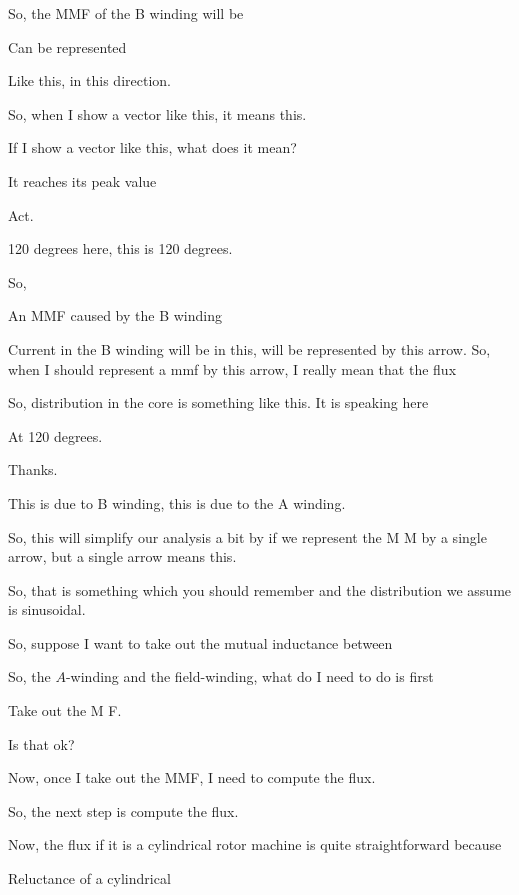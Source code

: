 \documentclass{article}
\begin{document}
So, the MMF of the B winding will be

Can be represented

Like this, in this direction.

So, when I show a vector like this, it means this.

If I show a vector like this, what does it mean?

It reaches its peak value

Act.

120 degrees here, this is 120 degrees.

So,

An MMF caused by the B winding

Current in the B winding will be in this, will be represented by this arrow. So, when I should represent a mmf by this arrow, I really mean that the flux

So, distribution in the core is something like this. It is speaking here

At 120 degrees.

Thanks.

This is due to B winding, this is due to the A winding.

So, this will simplify our analysis a bit by if we represent the M M by a single arrow, but a single arrow means this.

So, that is something which you should remember and the distribution we assume is sinusoidal.

So, suppose I want to take out the mutual inductance between

So, the $A$-winding and the field-winding, what do I need to do is first

Take out the M F.

Is that ok?

Now, once I take out the MMF, I need to compute the flux.

So, the next step is compute the flux.

Now, the flux if it is a cylindrical rotor machine is quite straightforward because

Reluctance of a cylindrical
\end{document}
